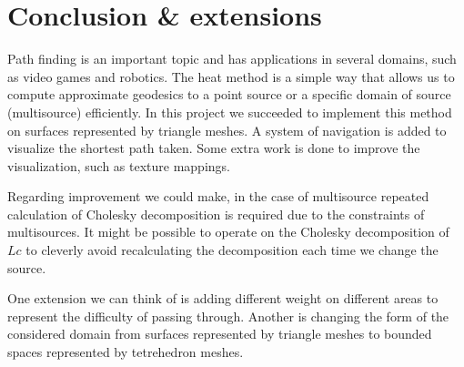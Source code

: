 \documentclass[a4paper,12pt,twoside]{article}
\begin{document}
\section{Conclusion \& extensions}
Path finding is an important topic and has applications in several domains, such as video games and robotics. The heat method is a simple way that allows us to compute approximate geodesics to a point source or a specific domain of source (multisource) efficiently. In this project we succeeded to implement this method on surfaces represented by triangle meshes. A system of navigation is added to visualize the shortest path taken. Some extra work is done to improve the visualization, such as texture mappings.

Regarding improvement we could make, in the case of multisource repeated calculation of Cholesky decomposition is required due to the constraints of multisources. It might be possible to operate on the Cholesky decomposition of $Lc$ to cleverly avoid recalculating the decomposition each time we change the source.

One extension we can think of is adding different weight on different areas to represent the difficulty of passing through. Another is changing the form of the considered domain from surfaces represented by triangle meshes to bounded spaces represented by tetrehedron meshes.
\end{document}
